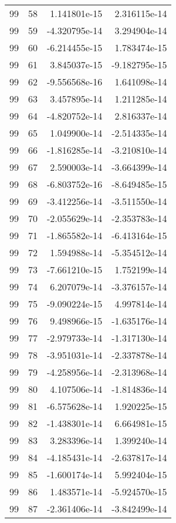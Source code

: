 \begin{tabular}{rrrr}
  99 &   58 &  1.141801e-15 &  2.316115e-14 \\
  99 &   59 & -4.320795e-14 &  3.294904e-14 \\
  99 &   60 & -6.214455e-15 &  1.783474e-15 \\
  99 &   61 &  3.845037e-15 & -9.182795e-15 \\
  99 &   62 & -9.556568e-16 &  1.641098e-14 \\
  99 &   63 &  3.457895e-14 &  1.211285e-14 \\
  99 &   64 & -4.820752e-14 &  2.816337e-14 \\
  99 &   65 &  1.049900e-14 & -2.514335e-14 \\
  99 &   66 & -1.816285e-14 & -3.210810e-14 \\
  99 &   67 &  2.590003e-14 & -3.664399e-14 \\
  99 &   68 & -6.803752e-16 & -8.649485e-15 \\
  99 &   69 & -3.412256e-14 & -3.511550e-14 \\
  99 &   70 & -2.055629e-14 & -2.353783e-14 \\
  99 &   71 & -1.865582e-14 & -6.413164e-15 \\
  99 &   72 &  1.594988e-14 & -5.354512e-14 \\
  99 &   73 & -7.661210e-15 &  1.752199e-14 \\
  99 &   74 &  6.207079e-14 & -3.376157e-14 \\
  99 &   75 & -9.090224e-15 &  4.997814e-14 \\
  99 &   76 &  9.498966e-15 & -1.635176e-14 \\
  99 &   77 & -2.979733e-14 & -1.317130e-14 \\
  99 &   78 & -3.951031e-14 & -2.337878e-14 \\
  99 &   79 & -4.258956e-14 & -2.313968e-14 \\
  99 &   80 &  4.107506e-14 & -1.814836e-14 \\
  99 &   81 & -6.575628e-14 &  1.920225e-15 \\
  99 &   82 & -1.438301e-14 &  6.664981e-15 \\
  99 &   83 &  3.283396e-14 &  1.399240e-14 \\
  99 &   84 & -4.185431e-14 & -2.637817e-14 \\
  99 &   85 & -1.600174e-14 &  5.992404e-15 \\
  99 &   86 &  1.483571e-14 & -5.924570e-15 \\
  99 &   87 & -2.361406e-14 & -3.842499e-14 \\

\end{tabular}
